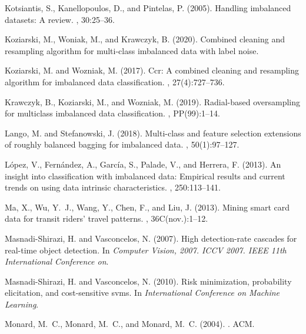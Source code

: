 \documentclass[runningheads]{llncs}
\begin{document}
\begin{thebibliography}{8}
  Kotsiantis, S., Kanellopoulos, D., and Pintelas, P. (2005).
  \newblock Handling imbalanced datasets: A review.
  , 30:25--36.
  
  Koziarski, M., Woniak, M., and Krawczyk, B. (2020).
  \newblock Combined cleaning and resampling algorithm for multi-class imbalanced
    data with label noise.
  
  Koziarski, M. and Wozniak, M. (2017).
  \newblock Ccr: A combined cleaning and resampling algorithm for imbalanced data
    classification.
  ,
    27(4):727--736.
  
  Krawczyk, B., Koziarski, M., and Wozniak, M. (2019).
  \newblock Radial-based oversampling for multiclass imbalanced data
    classification.
  ,
    PP(99):1--14.
  
  Lango, M. and Stefanowski, J. (2018).
  \newblock Multi-class and feature selection extensions of roughly balanced
    bagging for imbalanced data.
  , 50(1):97--127.
  
  López, V., Fernández, A., García, S., Palade, V., and Herrera, F. (2013).
  \newblock An insight into classification with imbalanced data: Empirical
    results and current trends on using data intrinsic characteristics.
  , 250:113--141.
  
  Ma, X., Wu, Y.~J., Wang, Y., Chen, F., and Liu, J. (2013).
  \newblock Mining smart card data for transit riders' travel patterns.
  , 36C(nov.):1--12.
  
  Masnadi-Shirazi, H. and Vasconcelos, N. (2007).
  \newblock High detection-rate cascades for real-time object detection.
  \newblock In {\em Computer Vision, 2007. ICCV 2007. IEEE 11th International
    Conference on}.
  
  Masnadi-Shirazi, H. and Vasconcelos, N. (2010).
  \newblock Risk minimization, probability elicitation, and cost-sensitive svms.
  \newblock In {\em International Conference on Machine Learning}.
  
  Monard, M.~C., Monard, M.~C., and Monard, M.~C. (2004).
  .
  \newblock ACM.
  

\end{thebibliography}
\end{document}
